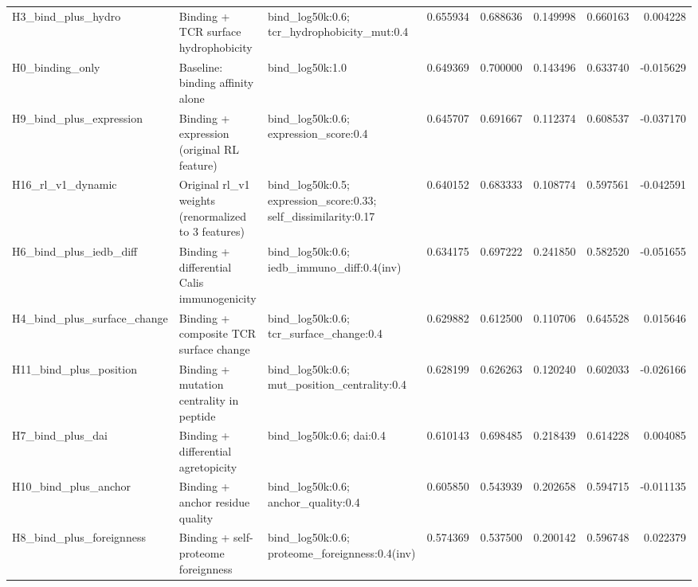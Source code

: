 \begin{table}
\begin{tabular}{lllrrrrr}
H3\_bind\_plus\_hydro & Binding + TCR surface hydrophobicity & bind\_log50k:0.6; tcr\_hydrophobicity\_mut:0.4 & 0.655934 & 0.688636 & 0.149998 & 0.660163 & 0.004228 \\
H0\_binding\_only & Baseline: binding affinity alone & bind\_log50k:1.0 & 0.649369 & 0.700000 & 0.143496 & 0.633740 & -0.015629 \\
H9\_bind\_plus\_expression & Binding + expression (original RL feature) & bind\_log50k:0.6; expression\_score:0.4 & 0.645707 & 0.691667 & 0.112374 & 0.608537 & -0.037170 \\
H16\_rl\_v1\_dynamic & Original rl\_v1 weights (renormalized to 3 features) & bind\_log50k:0.5; expression\_score:0.33; self\_dissimilarity:0.17 & 0.640152 & 0.683333 & 0.108774 & 0.597561 & -0.042591 \\
H6\_bind\_plus\_iedb\_diff & Binding + differential Calis immunogenicity & bind\_log50k:0.6; iedb\_immuno\_diff:0.4(inv) & 0.634175 & 0.697222 & 0.241850 & 0.582520 & -0.051655 \\
H4\_bind\_plus\_surface\_change & Binding + composite TCR surface change & bind\_log50k:0.6; tcr\_surface\_change:0.4 & 0.629882 & 0.612500 & 0.110706 & 0.645528 & 0.015646 \\
H11\_bind\_plus\_position & Binding + mutation centrality in peptide & bind\_log50k:0.6; mut\_position\_centrality:0.4 & 0.628199 & 0.626263 & 0.120240 & 0.602033 & -0.026166 \\
H7\_bind\_plus\_dai & Binding + differential agretopicity & bind\_log50k:0.6; dai:0.4 & 0.610143 & 0.698485 & 0.218439 & 0.614228 & 0.004085 \\
H10\_bind\_plus\_anchor & Binding + anchor residue quality & bind\_log50k:0.6; anchor\_quality:0.4 & 0.605850 & 0.543939 & 0.202658 & 0.594715 & -0.011135 \\
H8\_bind\_plus\_foreignness & Binding + self-proteome foreignness & bind\_log50k:0.6; proteome\_foreignness:0.4(inv) & 0.574369 & 0.537500 & 0.200142 & 0.596748 & 0.022379 \\
\bottomrule
\end{tabular}
\end{table}
